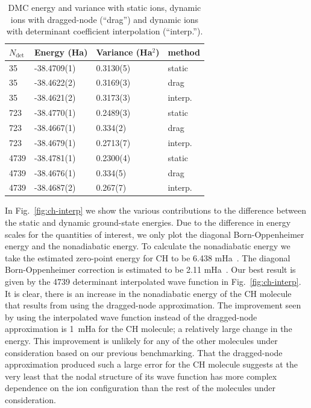 \documentclass[aip,jcp,numerical,reprint]{revtex4-1}
\begin{document}
\begin{table}[h]
\begin{tabular}{llll}
\hline\hline
$N_{\text{det}}$ & Energy (Ha) & Variance (Ha$^2$) & method \\
\hline
35   & -38.4709(1) &  0.3130(5) &    static \\
35   & -38.4622(2) &  0.3169(3) &   drag \\
35   & -38.4621(2) &  0.3173(3) &  interp. \\
723  & -38.4770(1)&  0.2489(3) &    static \\
723  & -38.4667(1) &  0.334(2)~  &   drag \\
723  & -38.4679(1) &  0.2713(7) &  interp. \\
4739 & -38.4781(1) &  0.2300(4) &    static \\
4739 & -38.4676(1) &  0.334(5)~  &   drag \\
4739 & -38.4687(2) &  0.267(7)~  &  interp. \\
\hline\hline
\end{tabular}
\caption{DMC energy and variance with static ions, dynamic ions with dragged-node (``drag'') and dynamic ions with determinant coefficient interpolation (``interp.'').\label{tab:energy}}
\end{table}

In Fig.~\ref{fig:ch-interp} we show the various contributions to the difference between the static and dynamic ground-state energies. Due to the difference in energy scales for the quantities of interest, we only plot the diagonal Born-Oppenheimer energy and the nonadiabatic energy.   To calculate the nonadiabatic energy we take the estimated zero-point energy for CH to be  6.438 mHa~\cite{Feller_Corrections}. The diagonal Born-Oppenheimer correction is estimated to be 2.11 mHa~\cite{Yang2015}. Our best result is given by the 4739 determinant interpolated wave function in Fig.~\ref{fig:ch-interp}.  It is clear, there is an increase in the nonadiabatic energy of the CH molecule that results from using the dragged-node approximation. %
 The improvement seen by using the interpolated wave function instead of the  dragged-node approximation is 1~mHa for the CH molecule; a relatively large change in the energy.  This improvement is unlikely for any of the other molecules under consideration based on our previous benchmarking.    That the dragged-node approximation produced such a large error for the CH molecule  suggests at the very least that the nodal structure of its wave function has more complex dependence on the ion configuration than the rest of the molecules under consideration.  
\end{document}
